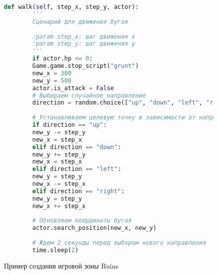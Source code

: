 \begin{figure}[H]
	\begin{lstlisting}[language=Python]	
		def walk(self, step_x, step_y, actor):
		'''
		Сценарий для движения бугая
		
		:param step_x: шаг движения x
		:param step_y: шаг движения y
		'''
		if actor.hp <= 0:
		Game.game.stop_script("grunt")
		new_x = 300
		new_y = 500
		actor.is_attack = False
		# Выбираем случайное направление
		direction = random.choice(["up", "down", "left", "right"])
		
		# Устанавливаем целевую точку в зависимости от направления
		if direction == "up":
		new_y -= step_y
		new_x = step_x
		elif direction == "down":
		new_y += step_y
		new_x = step_x
		elif direction == "left":
		new_y = step_y
		new_x -= step_x
		elif direction == "right":
		new_y = step_y
		new_x += step_x
		
		# Обновляем координаты бугая
		actor.search_position(new_x, new_y)
		
		# Ждем 2 секунды перед выбором нового направления
		time.sleep(2)
	\end{lstlisting}  
	\caption{Пример создания игровой зоны Ruins}
	\label{area2:image}
\end{figure}
